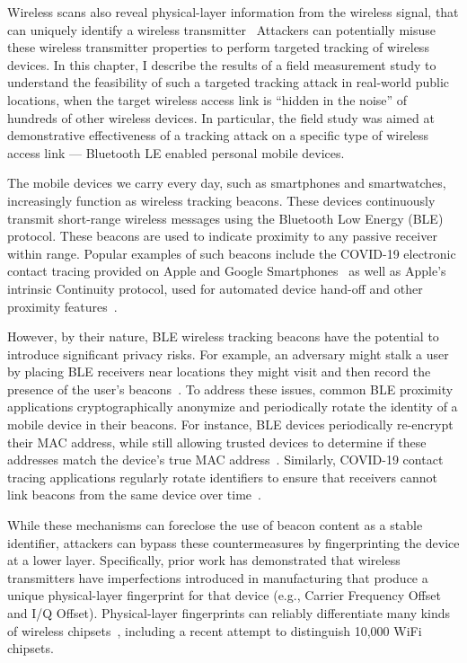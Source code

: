 
Wireless scans also reveal physical-layer information from the wireless signal, that can uniquely identify a wireless transmitter~\cite{Brik_radiometric,kaushik10000wifi}
%
Attackers can potentially misuse these wireless transmitter properties to perform targeted tracking of wireless devices.
%
In this chapter, I describe the results of a field measurement study to understand the feasibility of such a targeted tracking attack in real-world public locations, when the target wireless access link is ``hidden in the noise'' of hundreds of other wireless devices.
%
In particular, the field study was aimed at demonstrative effectiveness of a tracking attack on a specific type of wireless access link --- Bluetooth LE enabled personal mobile devices.


The mobile devices we carry every day, such as smartphones and
smartwatches, increasingly function as wireless tracking
beacons. These devices continuously transmit short-range wireless
messages using the Bluetooth Low Energy (BLE) protocol.  These beacons
are used to indicate proximity to any passive receiver within range.
Popular examples of such beacons include the COVID-19 electronic
contact tracing provided on Apple and Google
Smartphones~\cite{9-millionca} as well as Apple's intrinsic Continuity
protocol, used for automated device hand-off and other proximity
features~\cite{applecontinuity}.

However, by their nature, BLE wireless tracking beacons have the
potential to introduce significant privacy risks. For example, an
adversary might stalk a user by placing BLE receivers near locations
they might visit and then record the presence of the user's
beacons~\cite{exposurefaqmanual,dp3t}.  To address these issues, common BLE proximity
applications cryptographically anonymize and periodically rotate the
identity of a mobile device in their beacons. For instance, BLE
devices periodically re-encrypt their MAC address, while still
allowing trusted devices to determine if these addresses match the
device's true MAC address~\cite{bluetoothprivacy}. Similarly, COVID-19 contact tracing
applications regularly rotate identifiers to ensure that receivers
cannot link beacons from the same device over time~\cite{exposurenotificationmanual}.

While these mechanisms can foreclose the use of beacon content as a
stable identifier, attackers can bypass these countermeasures by
fingerprinting the device at a lower layer. Specifically, prior work
has demonstrated that wireless transmitters have imperfections
introduced in manufacturing that produce a unique physical-layer
fingerprint for that device (e.g., Carrier Frequency Offset and I/Q
Offset). Physical-layer fingerprints can reliably differentiate many
kinds of wireless chipsets~\cite{rfidphysical_danev,Brik_radiometric,transientBT_Hall,suskitransient,tximperfections_polak,femtocell_kennedy,adsb,subgrfid}, including a recent attempt to
distinguish 10,000 WiFi~\cite{kaushik10000wifi} chipsets.

